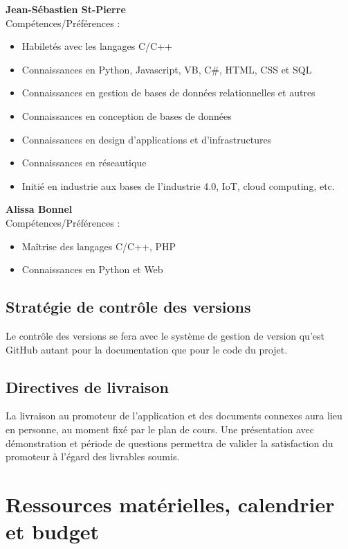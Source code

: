 \documentclass[12pt]{article}
\begin{document}
\noindent \textbf{Jean-Sébastien St-Pierre} \\
Compétences/Préférences :
\begin{itemize}
    \item Habiletés avec les langages C/C++
    \item Connaissances en Python, Javascript, VB, C\#, HTML, CSS et SQL
    \item Connaissances en  gestion de bases de données relationnelles et autres
    \item Connaissances en conception de bases de données
    \item Connaissances en design d'applications et d'infrastructures
    \item Connaissances en réseautique
    \item Initié en industrie aux bases de l’industrie 4.0, IoT, cloud
    computing, etc. \\
\end{itemize}

\noindent \textbf{Alissa Bonnel} \\
Compétences/Préférences :
\begin{itemize}
    \item Maîtrise des langages C/C++, PHP
    \item Connaissances en Python et Web 
\end{itemize}

\subsection{Stratégie de contrôle des versions}

Le contrôle des versions se fera avec le système de gestion de version qu'est GitHub autant
pour la documentation que pour le code du projet.

\subsection{Directives de livraison}
La livraison au promoteur de l'application et des documents connexes aura lieu en personne, au moment fixé par le plan de cours.  Une présentation avec démonstration et période de questions permettra de valider la satisfaction du promoteur à l'égard des livrables soumis.

\newpage

\section{Ressources matérielles, calendrier et budget}
\end{document}
